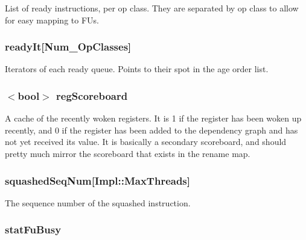 \label{classInstructionQueue_a84f7fc18dadb9ea3ef6ed7dd9f375c46}
List of ready instructions, per op class. They are separated by op class to allow for easy mapping to FUs. \hypertarget{classInstructionQueue_ac6c2d86489eaee465f91586553c3593f}{
\subsubsection[{readyIt}]{ {\bf readyIt}\mbox{[}{\bf Num\_\-OpClasses}\mbox{]}}}
\label{classInstructionQueue_ac6c2d86489eaee465f91586553c3593f}
Iterators of each ready queue. Points to their spot in the age order list. \hypertarget{classInstructionQueue_a61aeb86b87d1e105337b5a8973ce61f3}{
\subsubsection[{regScoreboard}]{$<$bool$>$ {\bf regScoreboard}}}
\label{classInstructionQueue_a61aeb86b87d1e105337b5a8973ce61f3}
A cache of the recently woken registers. It is 1 if the register has been woken up recently, and 0 if the register has been added to the dependency graph and has not yet received its value. It is basically a secondary scoreboard, and should pretty much mirror the scoreboard that exists in the rename map. \hypertarget{classInstructionQueue_a97d5a7e4630ad1d017909f7504b9ec32}{
\subsubsection[{squashedSeqNum}]{ {\bf squashedSeqNum}\mbox{[}Impl::MaxThreads\mbox{]}}}
\label{classInstructionQueue_a97d5a7e4630ad1d017909f7504b9ec32}
The sequence number of the squashed instruction. \hypertarget{classInstructionQueue_a92266bfdbc9a6de5005fc3f1654e0b3e}{
\subsubsection[{statFuBusy}]{ {\bf statFuBusy}}}
